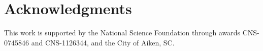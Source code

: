 \vspace{-15pt}
\section{Acknowledgments}\label{sec:acknowlegments}
\vspace{-10pt}
This work is supported by the National Science Foundation through awards CNS-0745846 and CNS-1126344, and the City of Aiken, SC.